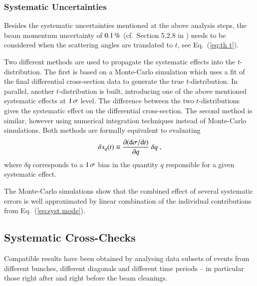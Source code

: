 
\subsubsection{Systematic Uncertainties}
\label{sec:systematics}

Besides the systematic uncertainties mentioned at the above analysis steps, the beam momentum uncertainty of $0.1\,{\rm \%}$ (cf.~Section 5.2.8 in \cite{8tev-90m}) needs to be considered when the scattering angles are translated to $t$, see Eq.~(\ref{eq:th t}).

Two different methods are used to propagate the systematic effects into the $t$-distribution. The first is based on a Monte-Carlo simulation which uses a fit of the final differential cross-section data to generate the true $t$-distribution. In parallel, another $t$-distribution is built, introducing one of the above mentioned systematic effects at $1\,{\rm \sigma}$ level. The difference between the two $t$-distributions gives the systematic effect on the differential cross-section. The second method is similar, however using numerical integration techniques instead of Monte-Carlo simulations. Both methods are formally equivalent to evaluating
\begin{equation}
\label{eq:syst mode}
\delta s_{q}(t) \equiv \frac{\partial({\rm d}\sigma/{\rm d} t)}{\partial q}\ \delta q\ ,
\end{equation}
where $\delta q$ corresponds to a $1\,{\rm \sigma}$ bias in the quantity $q$ responsible for a given systematic effect.

The Monte-Carlo simulations show that the combined effect of several systematic errors is well approximated by linear combination of the individual contributions from Eq.~(\ref{eq:syst mode}).



\subsection{Systematic Cross-Checks}
\label{sec:cross checks}

Compatible results have been obtained by analysing data subsets of events from different bunches, different diagonals and different time periods -- in particular those right after and right before the beam cleanings.



